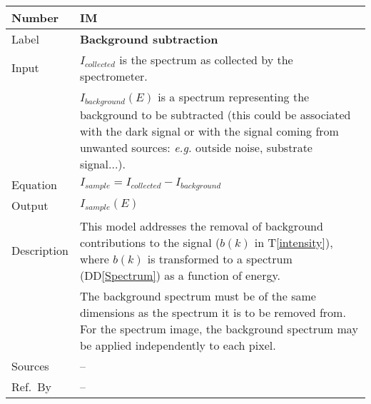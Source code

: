 \documentclass[12pt]{article}
\newcommand{\colAwidth}{0.13\textwidth}
\newcommand{\colBwidth}{0.82\textwidth}
\newcommand{\ddref}[1]{DD\ref{#1}}
\newcommand{\tref}[1]{T\ref{#1}}
\newcounter{instnum} %
\begin{document}
~\newline


\noindent
\begin{minipage}{\textwidth}
	\renewcommand*{\arraystretch}{1.5}
	\begin{tabular}{| p{\colAwidth} | p{\colBwidth}|}
		\hline
		\rowcolor[gray]{0.9}
		Number& IM{instnum}\theinstnum \label{background}\\
		\hline
		Label& \bf Background subtraction\\
		\hline
		Input & $I_{collected}$ is the spectrum as collected by the spectrometer.\\
		& $I_{background}(E)$ is a spectrum representing the background to be subtracted (this could be associated with the dark signal or with the signal coming from unwanted sources: \textit{e.g.} outside noise, substrate signal...).\\
		\hline
		Equation & $I_{sample}=I_{collected}-I_{background}$\\
		\hline
		Output& $I_{sample}(E)$\\
		\hline
		Description & This model addresses the removal of background contributions to the signal ($b(k)$ in \tref{intensity}), where $b(k)$ is transformed to a spectrum (\ddref{Spectrum}) as a function of energy.\\
		& The background spectrum must be of the same dimensions as the spectrum it is to be removed from. For the spectrum image, the background spectrum may be applied independently to each pixel.\\
		\hline
		Sources & -- \\
		\hline
		Ref.\ By & --\\
		\hline
	\end{tabular}
\end{minipage}\\

~\newline

\end{document}
